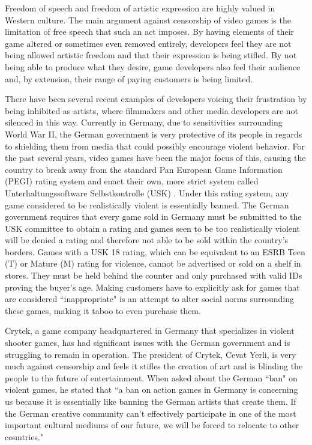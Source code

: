 Freedom of speech and freedom of artistic expression are highly valued in Western culture. The main argument against censorship of video games is the limitation of free speech that such an act imposes. By having elements of their game altered or sometimes even removed entirely, developers feel they are not being allowed artistic freedom and that their expression is being stifled. By not being able to produce what they desire, game developers also feel their audience and, by extension, their range of paying customers is being limited. 

There have been several recent examples of developers voicing their frustration by being inhibited as artists, where filmmakers and other media developers are not silenced in this way. Currently in Germany, due to sensitivities surrounding World War II, the German government is very protective of its people in regards to shielding them from media that could possibly encourage violent behavior. For the past several years, video games have been the major focus of this, causing the country to break away from the standard Pan European Game Information (PEGI) rating system \cite{pegi} and enact their own, more strict system called Unterhaltungssoftware Selbstkontrolle (USK) \cite{usk}. Under this rating system, any game considered to be realistically violent is essentially banned. The German government requires that every game sold in Germany must be submitted to the USK committee to obtain a rating and games seen to be too realistically violent will be denied a rating and therefore not able to be sold within the country's borders. Games with a USK 18 rating, which can be equivalent to an ESRB Teen (T) or Mature (M) rating for violence, cannot be advertised or sold on a shelf in stores. They must be held behind the counter and only purchased with valid IDs proving the buyer's age. Making customers have to explicitly ask for games that are considered ``inappropriate" is an attempt to alter social norms surrounding these games, making it taboo to even purchase them.

Crytek, a game company headquartered in Germany that specializes in violent shooter games, has had significant issues with the German government and is struggling to remain in operation. The president of Crytek, Cevat Yerli, is very much against censorship and feels it stifles the creation of art and is blinding the people to the future of entertainment. When asked about the German ``ban" on violent games, he stated that ``a ban on action games in Germany is concerning us because it is essentially like banning the German artists that create them. If the German creative community can't effectively participate in one of the most important cultural mediums of our future, we will be forced to relocate to other countries." \cite{yerli}


